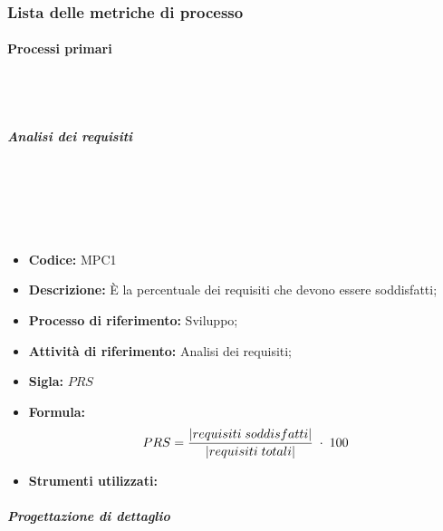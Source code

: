 \subsubsection{Lista delle metriche di processo}
\paragraph{Processi primari}\mbox{}\\ \\
\subparagraph{Analisi dei requisiti}\mbox{}\\ \\
    \mbox{}\\ \\
    \begin{itemize}
        \item \textbf{Codice:} MPC1
        \item \textbf{Descrizione:} È la percentuale dei requisiti che devono essere soddisfatti;
        \item \textbf{Processo di riferimento:} Sviluppo;
        \item \textbf{Attività di riferimento:} Analisi dei requisiti;
        \item \textbf{Sigla:} $PRS$
        \item \textbf{Formula:} $$PRS = {|requisiti \; soddisfatti| \over |requisiti \; totali|}\; \cdot \; 100$$
        \item \textbf{Strumenti utilizzati:}
    \end{itemize}
\subparagraph{Progettazione di dettaglio}\mbox{}\\
    \mbox{}\\
